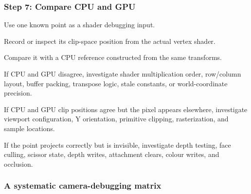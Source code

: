 \subsubsection{Step 7: Compare CPU and GPU}\label{step-7-compare-cpu-and-gpu}

Use one known point as a shader debugging input.

Record or inspect its clip-space position from the actual vertex shader.

Compare it with a CPU reference constructed from the same transforms.

If CPU and GPU disagree, investigate shader multiplication order, row/column layout, buffer packing, transpose logic, stale constants, or world-coordinate precision.

If CPU and GPU clip positions agree but the pixel appears elsewhere, investigate viewport configuration, Y orientation, primitive clipping, rasterization, and sample locations.

If the point projects correctly but is invisible, investigate depth testing, face culling, scissor state, depth writes, attachment clears, colour writes, and occlusion.

\subsubsection{A systematic camera-debugging matrix}\label{a-systematic-camera-debugging-matrix}

